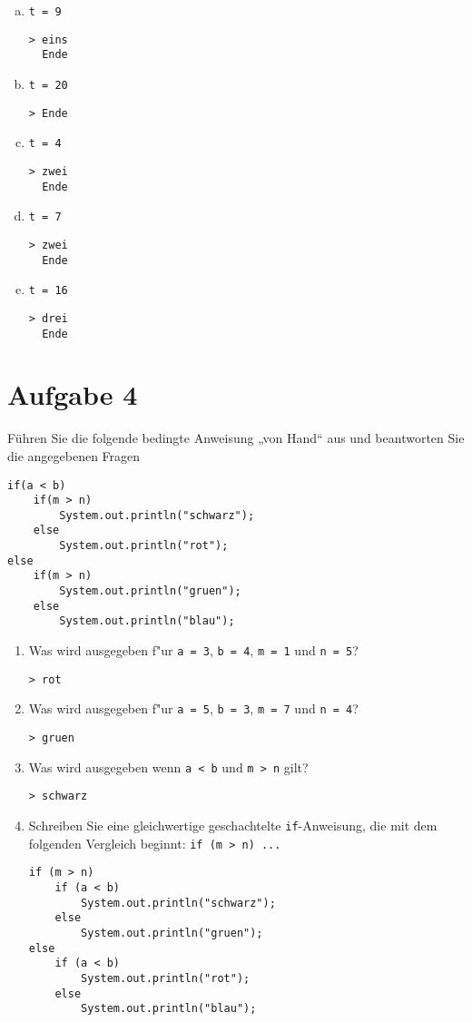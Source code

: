 \documentclass[10pt, oneside]{article}
\begin{document}
\begin{enumerate}[(a)]
    \item \verb|t = 9|
\begin{verbatim}
> eins
  Ende
\end{verbatim}
    \item \verb|t = 20|
\begin{verbatim}
> Ende
\end{verbatim}
    \item \verb|t = 4|
\begin{verbatim}
> zwei
  Ende
\end{verbatim}
    \item \verb|t = 7|
\begin{verbatim}
> zwei
  Ende
\end{verbatim}
    \item \verb|t = 16|
\begin{verbatim}
> drei
  Ende
\end{verbatim}
\end{enumerate}

\section{Aufgabe 4}

Führen Sie die folgende bedingte Anweisung „von Hand“ aus und beantworten Sie die
angegebenen Fragen

\begin{verbatim}
if(a < b)
    if(m > n)
        System.out.println("schwarz");
    else
        System.out.println("rot");
else
    if(m > n)
        System.out.println("gruen");
    else
        System.out.println("blau");
\end{verbatim}

\pagebreak
\begin{enumerate}
    \item Was wird ausgegeben f"ur \verb|a = 3|, \verb|b = 4|, \verb|m = 1| und \verb|n = 5|?
\begin{verbatim}
> rot
\end{verbatim}
    \item Was wird ausgegeben f"ur \verb|a = 5|, \verb|b = 3|, \verb|m = 7| und \verb|n = 4|?
\begin{verbatim}
> gruen
\end{verbatim}
    \item Was wird ausgegeben wenn \verb|a < b| und \verb|m > n| gilt?
\begin{verbatim}
> schwarz
\end{verbatim}
    \item Schreiben Sie eine gleichwertige geschachtelte \verb|if|-Anweisung,
        die mit dem folgenden Vergleich beginnt: \verb|if (m > n) ...|
\begin{verbatim}
if (m > n)
    if (a < b)
        System.out.println("schwarz");
    else
        System.out.println("gruen");
else
    if (a < b)
        System.out.println("rot");
    else
        System.out.println("blau");
\end{verbatim}
\end{enumerate}
\end{document}
